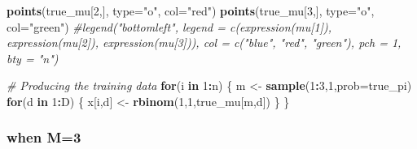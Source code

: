 \documentclass[
]{article}
\newenvironment{Shaded}{\begin{snugshade}}{\end{snugshade}}
\newcommand{\AttributeTok}[1]{\textcolor[rgb]{0.13,0.29,0.53}{#1}}
\newcommand{\CommentTok}[1]{\textcolor[rgb]{0.56,0.35,0.01}{\textit{#1}}}
\newcommand{\ControlFlowTok}[1]{\textcolor[rgb]{0.13,0.29,0.53}{\textbf{#1}}}
\newcommand{\DecValTok}[1]{\textcolor[rgb]{0.00,0.00,0.81}{#1}}
\newcommand{\FunctionTok}[1]{\textcolor[rgb]{0.13,0.29,0.53}{\textbf{#1}}}
\newcommand{\NormalTok}[1]{#1}
\newcommand{\OtherTok}[1]{\textcolor[rgb]{0.56,0.35,0.01}{#1}}
\newcommand{\SpecialCharTok}[1]{\textcolor[rgb]{0.81,0.36,0.00}{\textbf{#1}}}
\newcommand{\StringTok}[1]{\textcolor[rgb]{0.31,0.60,0.02}{#1}}
\begin{document}
\begin{Shaded}
\begin{Highlighting}[]
\FunctionTok{points}\NormalTok{(true\_mu[}\DecValTok{2}\NormalTok{,], }\AttributeTok{type=}\StringTok{"o"}\NormalTok{, }\AttributeTok{col=}\StringTok{"red"}\NormalTok{)}
\FunctionTok{points}\NormalTok{(true\_mu[}\DecValTok{3}\NormalTok{,], }\AttributeTok{type=}\StringTok{"o"}\NormalTok{, }\AttributeTok{col=}\StringTok{"green"}\NormalTok{)}
\CommentTok{\#legend("bottomleft", legend = c(expression(mu[1]), expression(mu[2]), expression(mu[3])), col = c("blue", "red", "green"), pch = 1, bty = "n")}

\CommentTok{\# Producing the training data}
\ControlFlowTok{for}\NormalTok{(i }\ControlFlowTok{in} \DecValTok{1}\SpecialCharTok{:}\NormalTok{n) \{}
\NormalTok{  m }\OtherTok{\textless{}{-}} \FunctionTok{sample}\NormalTok{(}\DecValTok{1}\SpecialCharTok{:}\DecValTok{3}\NormalTok{,}\DecValTok{1}\NormalTok{,}\AttributeTok{prob=}\NormalTok{true\_pi)}
  \ControlFlowTok{for}\NormalTok{(d }\ControlFlowTok{in} \DecValTok{1}\SpecialCharTok{:}\NormalTok{D) \{}
\NormalTok{    x[i,d] }\OtherTok{\textless{}{-}} \FunctionTok{rbinom}\NormalTok{(}\DecValTok{1}\NormalTok{,}\DecValTok{1}\NormalTok{,true\_mu[m,d])}
\NormalTok{  \}}
\NormalTok{\}}
\end{Highlighting}
\end{Shaded}

\hypertarget{when-m3-1}{%
\subsubsection{when M=3}\label{when-m3-1}}
\end{document}
